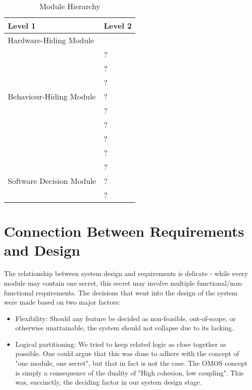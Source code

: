 \documentclass[12pt, titlepage]{article}
\newcommand{\newSection}[1]{
  \newpage
  \section{#1}
}
\begin{document}
	\begin{table}[h!]
		\centering
		\begin{tabular}{p{} p{}}
			\toprule
			\textbf{Level 1} & \textbf{Level 2}\\
			\midrule

			{Hardware-Hiding Module} & ~ \\
			\midrule

			\multirow{7}{0.3\textwidth}{Behaviour-Hiding Module} & ?\\
			& ?\\
			& ?\\
			& ?\\
			& ?\\
			& ?\\
			& ?\\ 
			& ?\\
			\midrule

			\multirow{3}{0.3\textwidth}{Software Decision Module} & {?}\\
			& ?\\
			& ?\\
			\bottomrule

		\end{tabular}
		\caption{Module Hierarchy}
		\label{TblMH}
	\end{table}

\newSection{Connection Between Requirements and Design} \label{SecConnection}

	
	The relationship between system design and requirements is delicate - while every module may contain one secret, this secret may involve multiple functional/non-functional requirements. The decisions that went into the design of the system were made based on two major factors:

	\begin{itemize}
		\item Flexibility: Should any feature be decided as non-feasible, out-of-scope, or otherwise unattainable, the system should not collapse due to its lacking.
		\item Logical partitioning: We tried to keep related logic as close together as possible. One could argue that this was done to adhere with the concept of "one module, one secret", but that in fact is not the case. The OMOS concept is simply a consequence of the duality of "High cohesion, low coupling". This was, succinctly, the deciding factor in our system design stage.
	\end{itemize}
\end{document}
